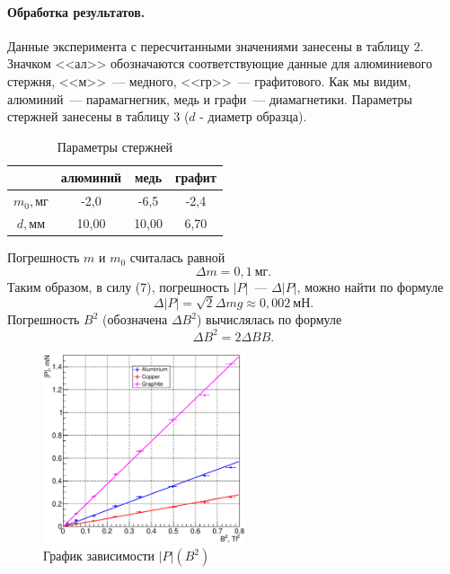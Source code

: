 \documentclass[12pt,a4paper]{article}
\begin{document}
\paragraph{Обработка результатов.} Данные эксперимента с пересчитанными значениями занесены в таблицу 2. Значком <<ал>> обозначаются соответствующие данные для алюминиевого стержня, <<м>>~--- медного, <<гр>>~--- графитового. Как мы видим, алюминий~--- парамагнегник, медь и графи~--- диамагнетики. Параметры стержней занесены в таблицу 3 ($d$ - диаметр образца).
\begin{table}[ht]\centering
\begin{tabular}{|c|c|c|c|}
\hline
~&алюминий&медь&графит\\
\hline
$m_0, \text{мг}$&-2,0&-6,5&-2,4\\
\hline
$d, \text{мм}$&10,00&10,00&6,70\\
\hline
\end{tabular}
\caption{Параметры стержней}
\end{table}
Погрешность $m$ и $m_0$ считалась равной
\begin{equation}
\Delta m = 0,1~\text{мг}.
\end{equation}
Таким образом, в силу (7), погрешность $|P|$~--- $\Delta |P|$, можно найти по формуле
\begin{equation}
\Delta |P| = \sqrt{2}\Delta m g \approx 0,002~\text{мН}.
\end{equation}
Погрешность $B^2$ (обозначена $\Delta B^2$) вычислялась по формуле
\begin{equation}
\Delta B^2 = 2\Delta B B.
\end{equation}
\begin{figure}
\centering\includegraphics[width = 0.53\textwidth]{Plt2}
\captionsetup{justification = centering}
\caption{График зависимости $|P|(B^2)$\label{Fig3}}
\vspace{10pt}
\end{figure}
\end{document}

